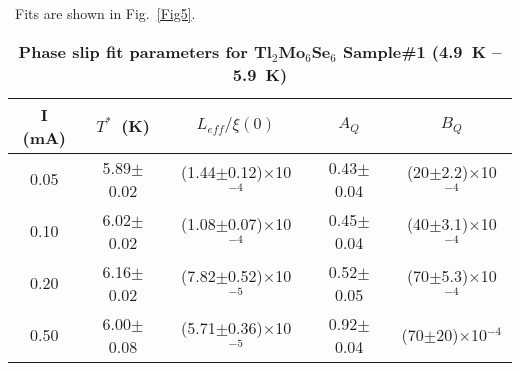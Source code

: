 \documentclass[prb,twocolumn,showpacs,preprintnumbers,amsmath,amssymb,floatfix,groupedaddress,superscriptaddress,aps,10pt]{revtex4-1}
\begin{document}
{{\begin{table}[htbp]
	\caption{\textbf{Phase slip fit parameters for Tl$_2$Mo$_6$Se$_6$ Sample\#1 (4.9~K -- 5.9~K)}} %
	~Fits are shown in Fig.~\ref{Fig5}.
	\centering %
	\small\addtolength{\tabcolsep}{-1.6pt}
	\begin{tabular}{ccccc} %
		\hline\hline %
		I (mA) & $T^*$~(K) & $L_{eff}/\xi(0)$ & $A_{Q}$ & $B_{Q}$ \\ [0.4ex] %
		\hline %
		0.05 \vline& 5.89$\pm$0.02 \vline& (1.44$\pm$0.12)$\times$10$^{-4}$ \vline& 0.43$\pm$0.04 \vline& (20$\pm$2.2)$\times$10$^{-4}$ \\
		0.10 \vline& 6.02$\pm$0.02 \vline& (1.08$\pm$0.07)$\times$10$^{-4}$ \vline& 0.45$\pm$0.04 \vline& (40$\pm$3.1)$\times$10$^{-4}$ \\ %
		0.20 \vline& 6.16$\pm$0.02 \vline& (7.82$\pm$0.52)$\times$10$^{-5}$ \vline& 0.52$\pm$0.05 \vline& (70$\pm$5.3)$\times$10$^{-4}$ \\ [1ex] %
		0.50 \vline& 6.00$\pm$0.08 \vline& (5.71$\pm$0.36)$\times$10$^{-5}$ \vline& 0.92$\pm$0.04 \vline& (70$\pm$20)$\times$10$^{-4}$ \\ [1ex] %
		\hline %
	\end{tabular}
	\label{table:PdBi2} %
\end{table} 



}}
\end{document}
